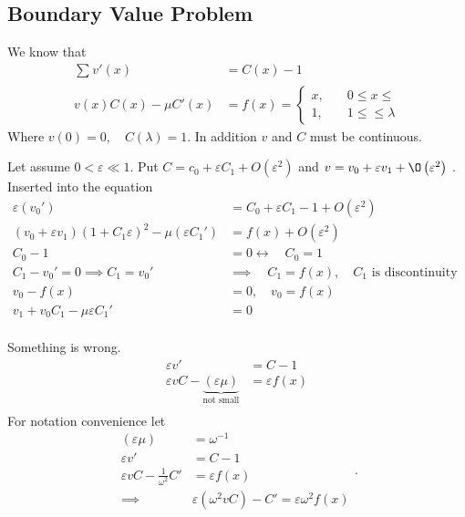 \documentclass{article}
\theoremstyle{remark}
\newcommand{\newpara}
  {
  \vskip 0.4cm
  }
\begin{document}
\subsection{Boundary Value Problem}%
\label{sub:boundary_value_problem}

We know that \[
  \begin{split}
\sum_{}^{} v' \left( x \right)  & = C\left( x \right) - 1 \\
v\left( x \right)C\left( x \right) - \mu  C' \left( x \right)  & = f\left( x \right) = \begin{cases}
  x,  &  \quad  0 \le x \le \\
  1,  &  \quad  1 \le \le \lambda   
\end{cases}
    \end{split} 
\] 
Where  $v\left( 0 \right) = 0, \quad    C\left( \lambda  \right)  =1 $.
In addition $v$ and $C$ must be continuous. 

\newpara
Let assume $ 0 < \varepsilon  \ll  1$. Put $C = c_{0} + \varepsilon  C_{1} + O \left( \varepsilon ^2 \right)$ and $v = v_{0} + \varepsilon  v_{1} + \O\left( \varepsilon ^2 \right)$ . Inserted into the equation \[
  \begin{split}
\varepsilon \left( v_{0}'   \right) &=  C_{0} + \varepsilon C_{1} - 1 + O\left( \varepsilon ^2 \right)  \\
\left( v_{0} + \varepsilon  v_{1} \right) \left( 1 + C_{1} \varepsilon  \right) ^2 - \mu \left(  \varepsilon  C_{1}'    \right)  &  = f\left( x \right) + O\left( \varepsilon ^2 \right)   \\
C_{0} - 1 &=  0 \leftrightarrow  \quad  C_{0} = 1  \\
C_{1} - v_{0}'  =  0  \implies  C_{1} = v_{0}'    & \implies \quad C_{1} = f\left( x \right) , \quad C_{1}\text{ is discontinuity }    \\
v_{0} - f\left( x \right) &=  0, \quad v_{0} = f\left( x \right)   \\
v_{1} + v_{0} C_{1} - \mu \varepsilon C_{1}'  &=  0 \\
  \end{split} 
\] 

Something is wrong. 
\[
\begin{split}
  \varepsilon  v'  &=  C- 1 \\
  \varepsilon  v C - \underbrace{\left( \varepsilon  \mu  \right)}_{ \text{not small} }  &=  \varepsilon f\left( x \right) \\
\end{split} 
\] 
For notation convenience let \[
\begin{split}
  \left( \varepsilon  \mu  \right) &= \omega ^{-1}   \\
  \varepsilon v'  &=  C - 1 \\
  \varepsilon vC - \frac{1}{\omega ^{2}} C'  &=  \varepsilon  f\left( x \right) \\
  \implies   &  \varepsilon \left( \omega ^2 v C \right) - C'  = \varepsilon  \omega ^2 f\left( x \right)
\end{split} .
\] 
\end{document}
